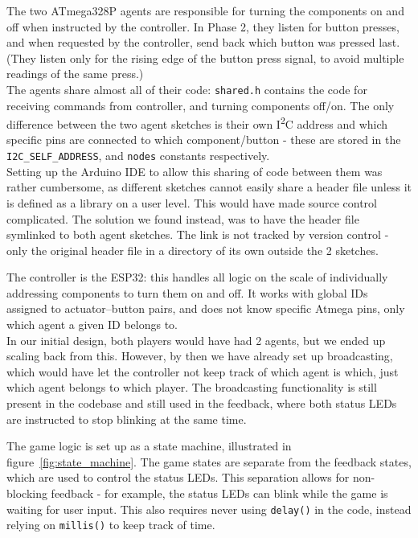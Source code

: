 \documentclass[acmsmall]{acmart}
\begin{document}
The two ATmega328P agents are responsible for turning the components on and off when instructed by the controller. In Phase 2, they listen for button presses, and when requested by the controller, send back which button was pressed last. (They listen only for the rising edge of the button press signal, to avoid multiple readings of the same press.)\\
The agents share almost all of their code: \texttt{shared.h} contains the code for receiving commands from controller, and turning components off/on. The only difference between the two agent sketches is their own I\textsuperscript{2}C address and which specific pins are connected to which component/button - these are stored in the \texttt{I2C\_SELF\_ADDRESS}, and \texttt{nodes} constants respectively. \\
Setting up the Arduino IDE to allow this sharing of code between them was rather cumbersome, as different sketches cannot easily share a header file unless it is defined as a library on a user level. This would have made source control complicated. The solution we found instead, was to have the header file symlinked to both agent sketches. The link is not tracked by version control - only the original header file in a directory of its own outside the 2 sketches.

The controller is the ESP32: this handles all logic on the scale of individually addressing components to turn them on and off. It works with global IDs assigned to actuator–button pairs, and does not know specific Atmega pins, only which agent a given ID belongs to.\\
In our initial design, both players would have had 2 agents, but we ended up scaling back from this. However, by then we have already set up broadcasting, which would have let the controller not keep track of which agent is which, just which agent belongs to which player. The broadcasting functionality is still present in the codebase and still used in the feedback, where both status LEDs are instructed to stop blinking at the same time.

The game logic is set up as a state machine, illustrated in figure~\ref{fig:state_machine}. The game states are separate from the feedback states, which are used to control the status LEDs. This separation allows for non-blocking feedback - for example, the status LEDs can blink while the game is waiting for user input. This also requires never using \texttt{delay()} in the code, instead relying on \texttt{millis()} to keep track of time.
\end{document}
